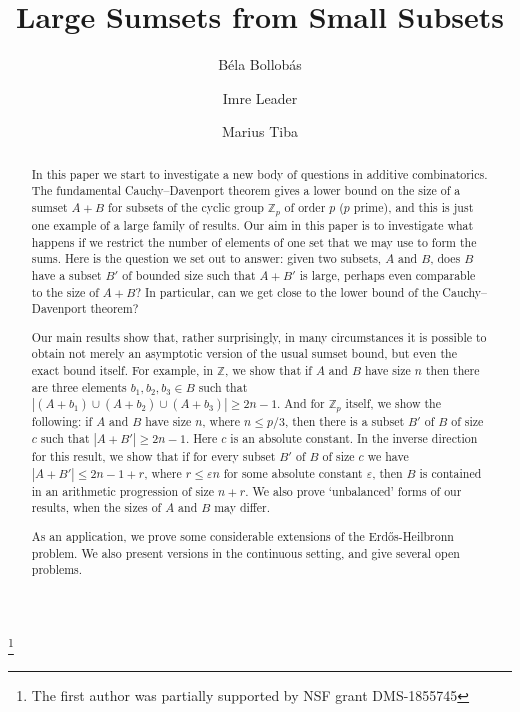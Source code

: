 \documentclass[12pt,reqno]{amsart}
\theoremstyle{definition}
\renewcommand\leq{\leqslant}
\renewcommand\geq{\geqslant}
\renewcommand\ge{\geqslant}
\begin{document}
\title{Large Sumsets from Small Subsets}
\author{B\'ela Bollob\'as \and Imre Leader \and Marius Tiba}

\address{Department of Pure Mathematics and Mathematical Statistics,
Wilberforce Road,
Cambridge, CB3 0WA, UK, and Department of Mathematical Sciences,
University of Memphis, Memphis, TN 38152, USA}

\address{Department of Pure Mathematics and Mathematical Statistics,
Wilberforce Road, Cambridge, CB3 0WA, UK}

\address{Department of Pure Mathematics and Mathematical Statistics,
Wilberforce Road, Cambridge, CB3 0WA, UK}

\thanks{The first author was partially supported by NSF grant DMS-1855745}

\begin{abstract}
In this paper we start to investigate a new body of questions in additive combinatorics.
The fundamental Cauchy--Davenport theorem gives a lower bound on the size of a sumset $A+B$ for subsets
of the cyclic group ${\mathbb Z}_p$ of order $p$ ($p$ prime), and this is just one example of a large
family of results. Our aim in this paper is to investigate what happens if we restrict the number of
elements of one set that we may use to form the sums. Here is the question we set out to answer:
given two subsets, $A$ and $B$, does $B$ have a subset $B'$ of bounded
size such that $A+B'$ is large, perhaps even comparable to the size of $A+B$? In particular,
can we get close to the lower bound of the Cauchy--Davenport theorem?

Our main results show that, rather surprisingly, in many circumstances it is possible to
obtain not merely an asymptotic version of the usual sumset bound, but even the exact bound
itself. For example, in ${\mathbb Z}$, we show that if $A$ and $B$ have size $n$ then there are
three elements $b_1,b_2,b_3 \in B$ such that $|(A+b_1)\cup (A+b_2) \cup (A+b_3)|\ge 2n-1$.
And for ${\mathbb Z}_p$ itself, we show the following: if $A$ and $B$ have size $n$, where
$n \leq p/3$, then there is a subset $B'$ of $B$ of size $c$ such that $|A+B'| \geq 2n-1$. Here
$c$ is an absolute constant. In the inverse direction for this result, we show
that if for
every subset $B'$ of $B$ of size $c$ we have
$|A + B'| \leq 2n-1+r$,
where $r \leq \varepsilon n$ for some absolute constant $\varepsilon$, then $B$ is contained in an
arithmetic progression of size
$n+r$. We also prove `unbalanced' forms
of our results, when the sizes of $A$ and $B$ may differ.

As an application, we prove some
considerable extensions of the Erd\H{o}s-Heilbronn problem. We also present versions in the continuous setting, and give
several open problems.

\end{abstract}
\end{document}
